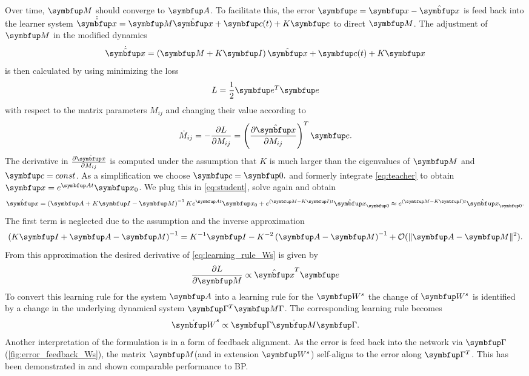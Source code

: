 Over time, $\bmu{M}$ should converge to $\bmu{A}$. To facilitate this, the error $\bmu{e} = \bmu{x} - \hat{\bmu{x}}$ is feed back into the learner system $\dot{\hat{\bmu{x}}} =\bmu{M}\hat{\bmu{x}} + \bmu{c}(t)  + K\bmu{e}$ to direct $\bmu{M}$.
The adjustment of $\bmu{M}$ in the modified dynamics
\begin{equation}\label{eq:student}
	\dot{\hat{\bmu{x}}} = \left(\bmu{M} + K\bmu{I}\right)\hat{\bmu{x}} + \bmu{c}(t) + K\bmu{x}
\end{equation}
is then calculated by using minimizing the loss
\begin{equation}
	L = \frac{1}{2}\bmu{e}^T\bmu{e}
\end{equation}
with respect to the matrix parameters $M_{ij}$ and changing their value according to
\begin{equation}\label{eq:learning_rule_Ws}
	\dot{M}_{ij} = -\frac{\partial L}{\partial M_{ij}} = \left(\frac{\partial \hat{\bmu{x}}}{\partial M_{ij}}\right)^T\bmu{e}.
\end{equation}
The derivative in $\frac{\partial \hat{\bmu{x}}}{\partial M_{ij}}$ is computed under the assumption that $K$ is much larger than the eigenvalues of $\bmu{M}$ and $\bmu{c} = const$. As a simplification we choose $\bmu{c} = \bmu{0}.$ and formerly integrate \cref{eq:teacher} to obtain $\bmu{x} = e^{\bmu{A}t}\bmu{x_0}$. We plug this in \cref{eq:student}, solve again and obtain
\begin{equation}\label{eq:hat_x_derivative}
	\hat{\bmu{x}} = \left(\bmu{A} + K\bmu{I} - \bmu{M}\right)^{-1}K e^{\bmu{A}t}\bmu{x_0} + e^{\left(\bmu{M}- K\bmu{I}\right)t}\hat{\bmu{x}}_{\bmu{0}}  \approx e^{\left(\bmu{M}- K\bmu{I}\right)t}\hat{\bmu{x}}_{\bmu{0}}.
\end{equation}
The first term is neglected due to the assumption and the inverse approximation
\begin{equation}
	\left(K\bmu{I} + \bmu{A} - \bmu{M}\right)^{-1}  = K^{-1}\bmu{I} - K^{-2}\left(\bmu{A} - \bmu{M}\right)^{-1} + \mathcal{O}(\|\bmu{A - \bmu{M}}\|^2).
\end{equation}
From this approximation the desired derivative of \cref{eq:learning_rule_Ws} is given by
\begin{equation}
	\frac{\partial L}{\partial \bmu{M}}\propto \hat{\bmu{x}}^T\bmu{e}
\end{equation}
To convert this learning rule for the system $\bmu{A}$ into a learning rule for the $\bmu{W}^s$ the change of $\bmu{W}^s$ is identified by a change in the underlying dynamical system $\bmu{\Gamma}^T \bmu{M \Gamma}$. The corresponding learning rule becomes
\begin{equation}
	\dot{\bmu{W}}^s \propto \bmu{\Gamma}\dot{\bmu{M}}\bmu{\Gamma}.
\end{equation}
Another interpretation of the formulation is in a form of feedback alignment. As the error is feed back into the network via $\bmu{\Gamma}$ (\cref{fig:error_feedback_Ws}), the matrix $\bmu{M}$(and in extension $\bmu{W}^s$) self-aligns to the error along $\bmu{\Gamma}^T$.
This has been demonstrated in \cite{lillicrap_random_2016} and shown comparable performance to \ac{BP}.

